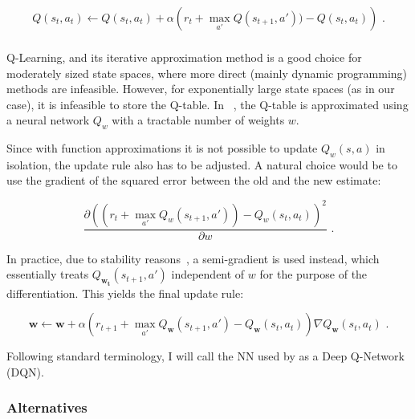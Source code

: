 \begin{equation} \label{eq:q-learningUpdate}
Q(s_t,a_t) \leftarrow Q(s_t,a_t) + \alpha\left( r_t + \max_{a'} Q(s_{t+1}, a')) - Q(s_t,a_t)\right) \text{ .}
\end{equation}


\subsubsection*{\DQL} \label{deepq-learning}


Q-Learning, and its iterative approximation method is a good choice for moderately sized state spaces, where more direct (mainly dynamic programming) methods are infeasible. However, for exponentially large state spaces (as in our case), it is infeasible to store the Q-table. In \DQL~\cite{mnih2013DQN}, the Q-table is approximated using a neural network $Q_w$ with a tractable number of weights $w$.

Since with function approximations it is not possible to update $Q_w(s, a)$ in isolation, the update rule also has to be adjusted. A natural choice would be to use the gradient of the squared error between the old and the new estimate:

$$\frac{\partial (( r_t + \max_{a'} Q_w(s_{t+1}, a')) - Q_w(s_t,a_t))^2}{\partial w} \text{ .}$$

In practice, due to stability reasons~\cite{barnard1993semigradient},  a semi-gradient is used instead, which essentially treats $Q_{\mathbf{w_t}}(s_{t+1}, a')$ independent of $w$ for the purpose of the differentiation. This yields the final update rule:


\begin{equation} \label{eq:deep-q-learning-update-with-semi-gradient}
\mathbf{w} \leftarrow \mathbf{w} + \alpha\left( r_{t+1}+ \max_{a'} Q_{\mathbf{w}}(s_{t+1}, a') - Q_{\mathbf{w}}(s_t,a_t)\right)\nabla Q_{\mathbf{w}}(s_{t}, a_t) \text{ .}
\end{equation}

Following standard terminology, I will call the NN used by \DQL as a Deep Q-Network (DQN).

\subsubsection*{Alternatives}

